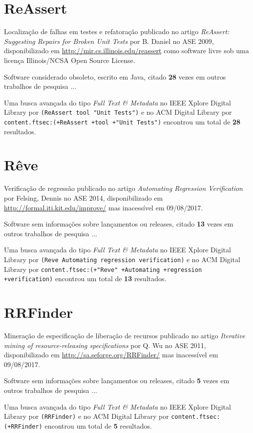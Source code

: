 \section{ReAssert}

Localização de falhas em testes e refatoração
publicado no artigo {\it ReAssert: Suggesting Repairs for Broken Unit Tests}
por B. Daniel
no ASE 2009,
disponibilizado em \url{http://mir.cs.illinois.edu/reassert}
como software livre
sob uma licença Illinois/NCSA Open Source License.

Software considerado obsoleto,
escrito em Java,
citado {\bf 28} vezes em outros trabalhos de pesquisa ...

Uma busca avançada do tipo {\it Full Text \& Metadata} no IEEE Xplore Digital Library por
\texttt{(ReAssert tool "Unit Tests")}
e no ACM Digital Library por
\texttt{content.ftsec:(+ReAssert +tool +"Unit Tests")}
encontrou um total de
{\bf 28}
resultados.

\section{Rêve}

Verificação de regressão
publicado no artigo {\it Automating Regression Verification}
por Felsing, Dennis
no ASE 2014,
disponibilizado em \url{http://formal.iti.kit.edu/improve/}
mas inacessível em 09/08/2017.

Software sem informações sobre lançamentos ou releases,
citado {\bf 13} vezes em outros trabalhos de pesquisa ...

Uma busca avançada do tipo {\it Full Text \& Metadata} no IEEE Xplore Digital Library por
\texttt{(Reve Automating regression verification)}
e no ACM Digital Library por
\texttt{content.ftsec:(+"Reve" +Automating +regression +verification)}
encontrou um total de
{\bf 13}
resultados.

\section{RRFinder}

Mineração de especificação de liberação de recursos
publicado no artigo {\it Iterative mining of resource-releasing specifications}
por Q. Wu
no ASE 2011,
disponibilizado em \url{http://sa.seforge.org/RRFinder/}
mas inacessível em 09/08/2017.

Software sem informações sobre lançamentos ou releases,
citado {\bf 5} vezes em outros trabalhos de pesquisa ...

Uma busca avançada do tipo {\it Full Text \& Metadata} no IEEE Xplore Digital Library por
\texttt{(RRFinder)}
e no ACM Digital Library por
\texttt{content.ftsec:(+RRFinder)}
encontrou um total de
{\bf 5}
resultados.

